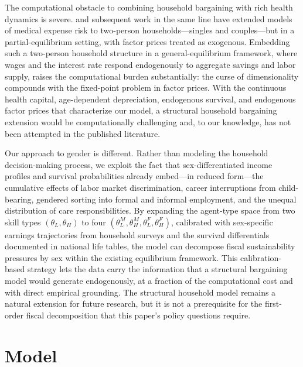 \documentclass[12pt,a4paper]{article}
\begin{document}
The computational obstacle to combining household bargaining with rich health dynamics is severe. \citet{DeNardi2010} and subsequent work in the same line have extended models of medical expense risk to two-person households---singles and couples---but in a partial-equilibrium setting, with factor prices treated as exogenous. Embedding such a two-person household structure in a general-equilibrium framework, where wages and the interest rate respond endogenously to aggregate savings and labor supply, raises the computational burden substantially: the curse of dimensionality compounds with the fixed-point problem in factor prices. With the continuous health capital, age-dependent depreciation, endogenous survival, and endogenous factor prices that characterize our model, a structural household bargaining extension would be computationally challenging and, to our knowledge, has not been attempted in the published literature.

Our approach to gender is different. Rather than modeling the household decision-making process, we exploit the fact that sex-differentiated income profiles and survival probabilities already embed---in reduced form---the cumulative effects of labor market discrimination, career interruptions from child-bearing, gendered sorting into formal and informal employment, and the unequal distribution of care responsibilities. By expanding the agent-type space from two skill types $(\theta_L, \theta_H)$ to four $(\theta_L^M, \theta_H^M, \theta_L^F, \theta_H^F)$, calibrated with sex-specific earnings trajectories from household surveys and the survival differentials documented in national life tables, the model can decompose fiscal sustainability pressures by sex within the existing equilibrium framework. This calibration-based strategy lets the data carry the information that a structural bargaining model would generate endogenously, at a fraction of the computational cost and with direct empirical grounding. The structural household model remains a natural extension for future research, but it is not a prerequisite for the first-order fiscal decomposition that this paper's policy questions require.

\bigskip

\section{Model}
\label{sec:model}

\bigskip
\end{document}
